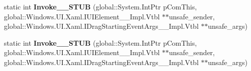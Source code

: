 \begin{DoxyCompactItemize}
static int {\bfseries Invoke\+\_\+\+\_\+\+S\+T\+UB} (global\+::\+System.\+Int\+Ptr p\+Com\+This, global\+::\+Windows.\+U\+I.\+Xaml.\+I\+U\+I\+Element\+\_\+\+\_\+\+Impl.\+Vtbl $\ast$$\ast$unsafe\+\_\+sender, global\+::\+Windows.\+U\+I.\+Xaml.\+I\+Drag\+Starting\+Event\+Args\+\_\+\+\_\+\+Impl.\+Vtbl $\ast$$\ast$unsafe\+\_\+args)
\item 
\mbox{\label{struct_windows_1_1_foundation_1_1_typed_event_handler___a___windows___u_i___xaml___u_i_element__45e7e61598f8bb4613234898c88fca41_a9144e3110595b584420e9f3bda03c48d}} 
static int {\bfseries Invoke\+\_\+\+\_\+\+S\+T\+UB} (global\+::\+System.\+Int\+Ptr p\+Com\+This, global\+::\+Windows.\+U\+I.\+Xaml.\+I\+U\+I\+Element\+\_\+\+\_\+\+Impl.\+Vtbl $\ast$$\ast$unsafe\+\_\+sender, global\+::\+Windows.\+U\+I.\+Xaml.\+I\+Drag\+Starting\+Event\+Args\+\_\+\+\_\+\+Impl.\+Vtbl $\ast$$\ast$unsafe\+\_\+args)
\end{DoxyCompactItemize}
